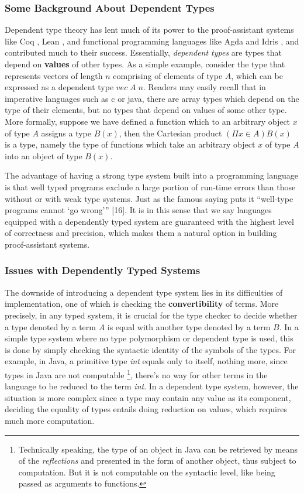 \documentclass{article}
\theoremstyle{remark}
\begin{document}
\subsubsection{Some Background About Dependent Types}
Dependent type theory has lent much of its power to the proof-assistant systems like Coq \cite{huet1997coq}, Lean \cite{de2015lean}, and functional programming languages like Agda \cite{norell2008dependently} and Idris \cite{brady2013idris}, and contributed much to their success. Essentially, \emph{dependent types} are types that depend on \textbf{values} of other types. As a simple example, consider the type that represents vectors of length $n$ comprising of elements of type $A$, which can be expressed as a dependent type $vec\; A\; n$. Readers may easily recall that in imperative languages such as c or java, there are array types which depend on the type of their elements, but no types that depend on values of some other type. More formally, suppose we have defined a function which to an arbitrary object $x$ of type $A$ assigns a type $B(x)$, then the Cartesian product $(\Pi x \in A)B(x)$ is a type, namely the type of functions which take an arbitrary object $x$ of type $A$ into an object of type $B(x)$.

The advantage of having a strong type system built into a programming language is that well typed programs exclude a large portion of run-time errors than those without or with weak type systems. Just as the famous saying puts it “well-type programs cannot ‘go wrong’” [16]. It is in this sense that we say languages equipped with a dependently typed system are guaranteed with the highest level of correctness and precision, which makes them a natural option in building proof-assistant systems.

\subsubsection{Issues with Dependently Typed Systems}
The downside of introducing a dependent type system lies in its difficulties of implementation, one of which is checking the \textbf{convertibility} of terms. More precisely, in any typed system, it is crucial for the type checker to decide whether a type denoted by a term $A$ is equal with another type denoted by a term $B$. In a simple type system where no type polymorphism or dependent type is used, this is done by simply checking the syntactic identity of the symbols of the types. For example, in Java, a primitive type \emph{int} equals only to itself, nothing more, since types in Java are not computable \footnote{Technically speaking, the type of an object in Java can be retrieved by means of the \emph{reflections} and presented in the form of another object, thus subject to computation. But it is not computable on the syntactic level, like being passed as arguments to functions.}, there's no way for other terms in the language to be reduced to the term \emph{int}. In a dependent type system, however, the situation is more complex since a type may contain any value as its component, deciding the equality of types entails doing reduction on values, which requires much more computation.
\end{document}
